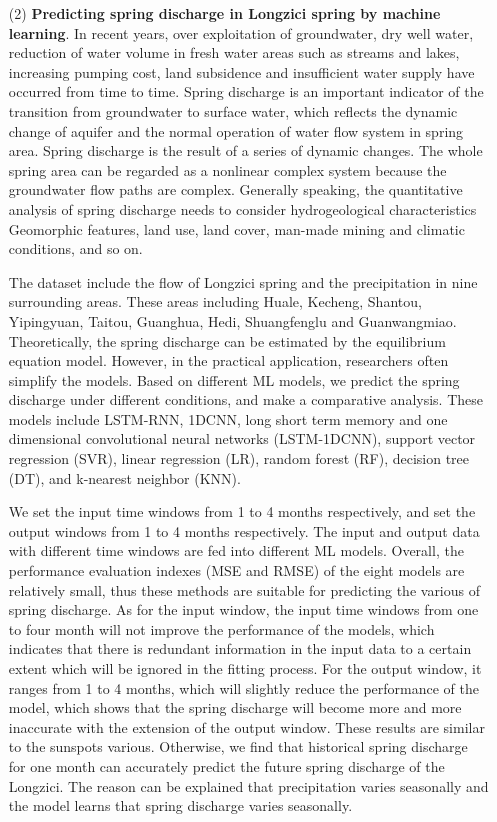\begin{enumerate}
  \item[(2)] \textbf{Predicting spring discharge in Longzici spring by machine learning}. In recent years, over exploitation of groundwater, dry well water, reduction of water volume in fresh water areas such as streams and lakes, increasing pumping cost, land subsidence and insufficient water supply have occurred from time to time. Spring discharge is an important indicator of the transition from groundwater to surface water, which reflects the dynamic change of aquifer and the normal operation of water flow system in spring area. Spring discharge is the result of a series of dynamic changes. The whole spring area can be regarded as a nonlinear complex system because the groundwater flow paths are complex. Generally speaking, the quantitative analysis of spring discharge needs to consider hydrogeological characteristics Geomorphic features, land use, land cover, man-made mining and climatic conditions, and so on.
  
  The dataset include the flow of Longzici spring and the precipitation in nine surrounding areas. These areas including Huale, Kecheng, Shantou, Yipingyuan, Taitou, Guanghua, Hedi, Shuangfenglu and Guanwangmiao. Theoretically, the spring discharge can be estimated by the equilibrium equation model. However, in the practical application, researchers often simplify the models. Based on different ML models, we predict the spring discharge under different conditions, and make a comparative analysis. These models include LSTM-RNN, 1DCNN, long short term memory and one dimensional convolutional neural networks (LSTM-1DCNN), support vector regression (SVR), linear regression (LR), random forest (RF), decision tree (DT), and k-nearest neighbor (KNN).

  We set the input time windows from 1 to 4 months respectively, and set the output windows from 1 to 4 months respectively. The input and output data with different time windows are fed into different ML models. Overall, the performance evaluation indexes (MSE and RMSE) of the eight models are relatively small, thus these methods are suitable for predicting the various of spring discharge. As for the input window, the input time windows from one to four month will not improve the performance of the models, which indicates that there is redundant information in the input data to a certain extent which will be ignored in the fitting process. For the output window, it ranges from 1 to 4 months, which will slightly reduce the performance of the model, which shows that the spring discharge will become more and more inaccurate with the extension of the output window. These results are similar to the sunspots various. Otherwise, we find that historical spring discharge for one month can accurately predict the future spring discharge of the Longzici. The reason can be explained that precipitation varies seasonally and the model learns that spring discharge varies seasonally.
  

\end{enumerate}

